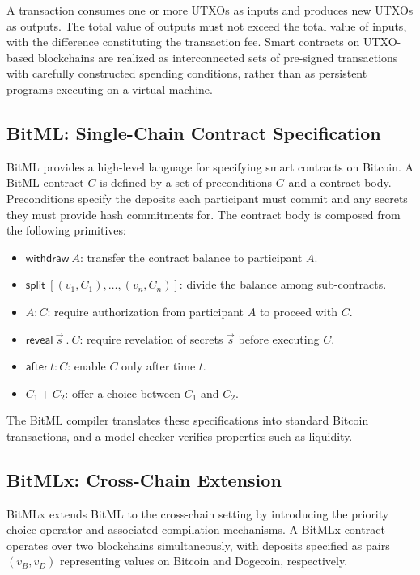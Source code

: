 \documentclass[journal]{IEEEtran}
\begin{document}
A transaction consumes one or more UTXOs as inputs and produces new UTXOs as outputs. The total value of outputs must not exceed the total value of inputs, with the difference constituting the transaction fee. Smart contracts on UTXO-based blockchains are realized as interconnected sets of pre-signed transactions with carefully constructed spending conditions, rather than as persistent programs executing on a virtual machine.

\subsection{BitML: Single-Chain Contract Specification}

BitML provides a high-level language for specifying smart contracts on Bitcoin. A BitML contract $C$ is defined by a set of preconditions $G$ and a contract body. Preconditions specify the deposits each participant must commit and any secrets they must provide hash commitments for. The contract body is composed from the following primitives:

\begin{itemize}
\item $\textsf{withdraw}~A$: transfer the contract balance to participant $A$.
\item $\textsf{split}~[(v_1, C_1), \ldots, (v_n, C_n)]$: divide the balance among sub-contracts.
\item $A : C$: require authorization from participant $A$ to proceed with $C$.
\item $\textsf{reveal}~\vec{s}~.~C$: require revelation of secrets $\vec{s}$ before executing $C$.
\item $\textsf{after}~t : C$: enable $C$ only after time $t$.
\item $C_1 + C_2$: offer a choice between $C_1$ and $C_2$.
\end{itemize}

The BitML compiler translates these specifications into standard Bitcoin transactions, and a model checker verifies properties such as liquidity.

\subsection{BitMLx: Cross-Chain Extension}

BitMLx extends BitML to the cross-chain setting by introducing the priority choice operator and associated compilation mechanisms. A BitMLx contract operates over two blockchains simultaneously, with deposits specified as pairs $(v_B, v_D)$ representing values on Bitcoin and Dogecoin, respectively.
\end{document}
